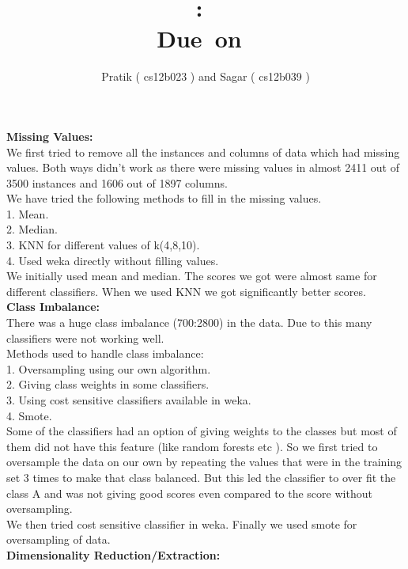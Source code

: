 \documentclass{article}
\title{
\textmd{\textbf{\hmwkClass:\ \hmwkTitle}}\\
\normalsize\vspace{0.1in}\small{Due\ on\ \hmwkDueDate}\\
}
\author{\textbf{\hmwkAuthorName}}
\date{Pratik ( cs12b023 ) and Sagar ( cs12b039 )} %
\begin{document}
\maketitle
{\bf Missing Values:}\\

We first tried to remove all the instances and columns of data which had missing values. Both ways didn't work as there were missing values in almost 2411 out of 3500 instances and 1606 out of 1897 columns.\\
We have tried the following methods to fill in the missing values.\\
1. Mean.\\
2. Median.\\
3. KNN for different values of k(4,8,10).\\
4. Used weka directly without filling values.\\

We initially used mean and median. The scores we got were almost same for different classifiers. When we used KNN we got significantly better scores.\\

{\bf Class Imbalance:}\\

There was a huge class imbalance (700:2800) in the data. Due to this many classifiers were not working well.\\
Methods used to handle class imbalance:\\
1. Oversampling using our own algorithm.\\
2. Giving class weights in some classifiers.\\
3. Using cost sensitive classifiers available in weka.\\
4. Smote.\\

Some of the classifiers had an option of giving weights to the classes but most of them did not have this feature (like random forests etc ). So we first tried to oversample the data on our own by repeating the values that were in the training set 3 times to make that class balanced. But this led the classifier to over fit the class A and was not giving good scores even compared to the score without oversampling.\\
We then tried cost sensitive classifier in weka. Finally we used smote for oversampling of data.\\

{\bf Dimensionality Reduction/Extraction:}\\
\end{document}
